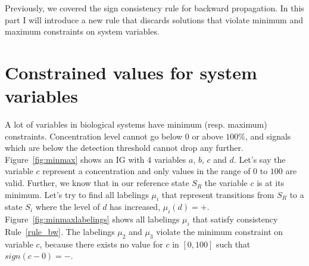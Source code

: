 Previously, we covered the sign consistency rule for backward propagation.
In this part I will introduce a new rule that discards solutions that
violate minimum and maximum constraints on system variables.

 
\section*{Constrained values for system variables} 

A lot of variables in biological systems have minimum (resp. maximum) constraints.
Concentration level cannot go below $0$ or above $100\%$, and 
signals which are below the detection threshold cannot drop any further.
Figure~\ref{fig:minmax} shows an IG with $4$ variables $a$, $b$, $c$ and $d$. 
Let's say the variable $c$ represent a concentration and only values in the range of $0$ to $100$ are valid.
Further, we know that in our reference state $S_R$ the variable $c$ is at its minimum.
Let's try to find all labelings $\mu_{i}$ that represent transitions from $S_R$ to a state $S_i$ 
 where the level of $d$ has increased, $\mu_{i}(d)=\plus$.
Figure~\ref{fig:minmaxlabelings} shows all labelings $\mu_{i}$ that satisfy consistency Rule~\ref{rule_bw}.
The labelings $\mu_2$ and $\mu_3$ violate the minimum constraint on variable $c$, 
 because there exists no value for $c$ in $[0,100]$ such that $ sign(c-0)=\minus$.


